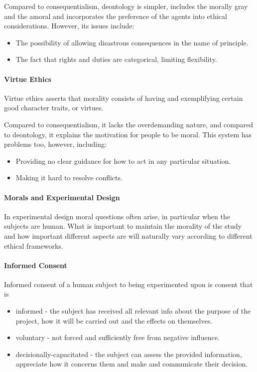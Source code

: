 Compared to consequentialism, deontology is simpler, includes the morally gray and the amoral and incorporates the preference of the agents into ethical considerations. However, its issues include:
\begin{itemize}
	\item The possibility of allowing disastrous consequences in the name of principle.
	\item The fact that rights and duties are categorical, limiting flexibility.
\end{itemize}

\paragraph{Virtue Ethics}
Virtue ethics asserts that morality consists of having and exemplifying certain good character traits, or virtues.

Compared to consequentialism, it lacks the overdemanding nature, and compared to deontology, it explains the motivation for people to be moral. This system has problems too, however, including:
\begin{itemize}
	\item Providing no clear guidance for how to act in any particular situation.
	\item Making it hard to resolve conflicts.
\end{itemize}

\paragraph{Morals and Experimental Design}
In experimental design moral questions often arise, in particular when the subjects are human. What is important to maintain the morality of the study and how important different aspects are will naturally vary according to different ethical frameworks.

\paragraph{Informed Consent}
Informed consent of a human subject to being experimented upon is consent that is
\begin{itemize}
	\item informed - the subject has received all relevant info about the purpose of the project, how it will be carried out and the effects on themselves.
	\item voluntary - not forced and sufficiently free from negative influence.
	\item decisionally-capacitated - the subject can assess the provided information, appreciate how it concerns them and make and communicate their decision.
\end{itemize}

